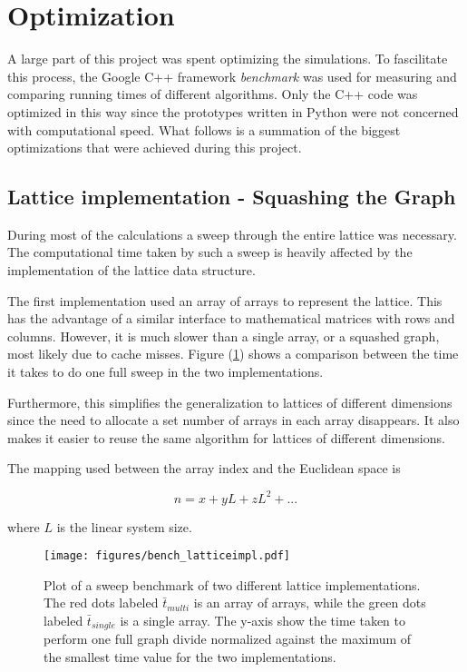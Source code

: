 \section{Optimization}
\label{sec:Optimization}

A large part of this project was spent optimizing the simulations. To fascilitate this process, the Google C++ framework \textit{benchmark} was used for measuring and comparing running times of different algorithms. Only the C++ code was optimized in this way since the prototypes written in Python were not concerned with computational speed. What follows is a summation of the biggest optimizations that were achieved during this project.

\subsection{Lattice implementation - Squashing the Graph}
\label{subsec:LatticeImpl}

During most of the calculations a sweep through the entire lattice was necessary. The computational time taken by such a sweep is heavily affected by the implementation of the lattice data structure.

The first implementation used an array of arrays to represent the lattice. This has the advantage of a similar interface to mathematical matrices with rows and columns. However, it is much slower than a single array, or a squashed graph, most likely due to cache misses\cite{Hanlon:CacheMisses}. Figure (\ref{fig:bench_latticeimpl}) shows a comparison between the time it takes to do one full sweep in the two implementations.

Furthermore, this simplifies the generalization to lattices of different dimensions since the need to allocate a set number of arrays in each array disappears. It also makes it easier to reuse the same algorithm for lattices of different dimensions.

The mapping used between the array index and the Euclidean space is

\begin{equation}
    n = x + y L + z L^2 + ...
\end{equation}

where $L$ is the linear system size.

\begin{figure}[h!]
    \centering
        \texttt{[image: figures/bench\_latticeimpl.pdf]}
    \caption{Plot of a sweep benchmark of two different lattice implementations. The red dots labeled $\bar t_{multi}$ is an array of arrays, while the green dots labeled $\bar t_{single}$ is a single array. The y-axis show the time taken to perform one full graph divide normalized against the maximum of the smallest time value for the two implementations.}
    \label{fig:bench_latticeimpl}
\end{figure}

